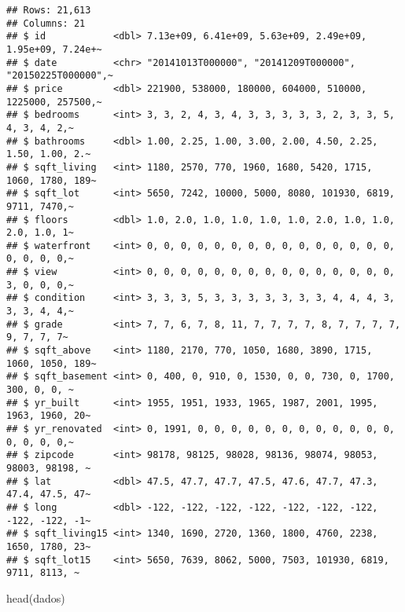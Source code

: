 \documentclass[
]{article}
\newenvironment{Shaded}{\begin{snugshade}}{\end{snugshade}}
\newcommand{\FunctionTok}[1]{\textcolor[rgb]{0.00,0.00,0.00}{#1}}
\newcommand{\NormalTok}[1]{#1}
\begin{document}
\begin{verbatim}
## Rows: 21,613
## Columns: 21
## $ id            <dbl> 7.13e+09, 6.41e+09, 5.63e+09, 2.49e+09, 1.95e+09, 7.24e+~
## $ date          <chr> "20141013T000000", "20141209T000000", "20150225T000000",~
## $ price         <dbl> 221900, 538000, 180000, 604000, 510000, 1225000, 257500,~
## $ bedrooms      <int> 3, 3, 2, 4, 3, 4, 3, 3, 3, 3, 3, 2, 3, 3, 5, 4, 3, 4, 2,~
## $ bathrooms     <dbl> 1.00, 2.25, 1.00, 3.00, 2.00, 4.50, 2.25, 1.50, 1.00, 2.~
## $ sqft_living   <int> 1180, 2570, 770, 1960, 1680, 5420, 1715, 1060, 1780, 189~
## $ sqft_lot      <int> 5650, 7242, 10000, 5000, 8080, 101930, 6819, 9711, 7470,~
## $ floors        <dbl> 1.0, 2.0, 1.0, 1.0, 1.0, 1.0, 2.0, 1.0, 1.0, 2.0, 1.0, 1~
## $ waterfront    <int> 0, 0, 0, 0, 0, 0, 0, 0, 0, 0, 0, 0, 0, 0, 0, 0, 0, 0, 0,~
## $ view          <int> 0, 0, 0, 0, 0, 0, 0, 0, 0, 0, 0, 0, 0, 0, 0, 3, 0, 0, 0,~
## $ condition     <int> 3, 3, 3, 5, 3, 3, 3, 3, 3, 3, 3, 4, 4, 4, 3, 3, 3, 4, 4,~
## $ grade         <int> 7, 7, 6, 7, 8, 11, 7, 7, 7, 7, 8, 7, 7, 7, 7, 9, 7, 7, 7~
## $ sqft_above    <int> 1180, 2170, 770, 1050, 1680, 3890, 1715, 1060, 1050, 189~
## $ sqft_basement <int> 0, 400, 0, 910, 0, 1530, 0, 0, 730, 0, 1700, 300, 0, 0, ~
## $ yr_built      <int> 1955, 1951, 1933, 1965, 1987, 2001, 1995, 1963, 1960, 20~
## $ yr_renovated  <int> 0, 1991, 0, 0, 0, 0, 0, 0, 0, 0, 0, 0, 0, 0, 0, 0, 0, 0,~
## $ zipcode       <int> 98178, 98125, 98028, 98136, 98074, 98053, 98003, 98198, ~
## $ lat           <dbl> 47.5, 47.7, 47.7, 47.5, 47.6, 47.7, 47.3, 47.4, 47.5, 47~
## $ long          <dbl> -122, -122, -122, -122, -122, -122, -122, -122, -122, -1~
## $ sqft_living15 <int> 1340, 1690, 2720, 1360, 1800, 4760, 2238, 1650, 1780, 23~
## $ sqft_lot15    <int> 5650, 7639, 8062, 5000, 7503, 101930, 6819, 9711, 8113, ~
\end{verbatim}

\begin{Shaded}
\begin{Highlighting}[]
\FunctionTok{head}\NormalTok{(dados)}
\end{Highlighting}
\end{Shaded}
\end{document}
